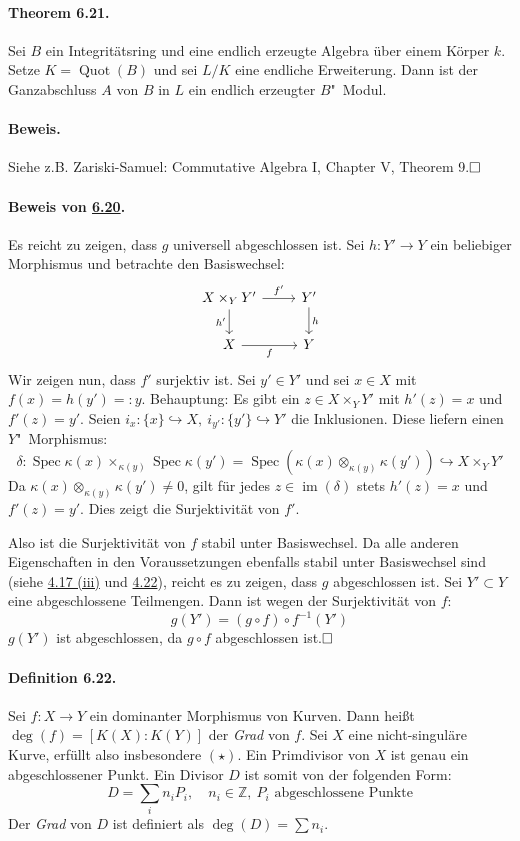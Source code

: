 \documentclass[11pt,b5paper,openany]{memoir}
\def \qed {$\hfill\square$}
\begin{document}
\paragraph{Theorem 6.21.}\label{6.21} Sei $B$ ein Integritätsring und eine endlich erzeugte Algebra über einem Körper $k$. Setze $K=\operatorname{Quot}(B)$ und sei $L/K$ eine endliche Erweiterung. Dann ist der Ganzabschluss $A$ von $B$ in $L$ ein endlich erzeugter $B$"~Modul.

\paragraph{Beweis.} Siehe z.B. Zariski-Samuel: Commutative Algebra I, Chapter V, Theorem 9.\qed

\paragraph{Beweis von \hyperref[6.20]{6.20}.} Es reicht zu zeigen, dass $g$ universell abgeschlossen ist. Sei $h:Y'\to Y$ ein beliebiger Morphismus und betrachte den Basiswechsel:
\[\begin{tikzcd}
X\times_Y Y' \ar[r, "f'"]\ar[d, "h'"'] & Y' \ar[d, "h"]\\
X\ar[r, "f"'] & Y
\end{tikzcd} \]
Wir zeigen nun, dass $f'$ surjektiv ist. Sei $y'\in Y'$ und sei $x\in X$ mit $f(x)=h(y')=:y$. Behauptung: Es gibt ein $z\in X\times_YY'$ mit $h'(z)=x$ und $f'(z)=y'$. Seien $i_x:\{x\}\hookrightarrow X,\ i_{y'}:\{y'\}\hookrightarrow Y'$ die Inklusionen. Diese liefern einen $Y$"~Morphismus:
\[\delta : \operatorname{Spec}\kappa(x)\times_{\kappa(y)}\operatorname{Spec}\kappa(y') = \operatorname{Spec}(\kappa(x)\otimes_{\kappa(y)}\kappa(y'))\hookrightarrow X\times_YY' \]
Da $\kappa(x)\otimes_{\kappa(y)}\kappa(y')\neq 0$, gilt für jedes $z\in\operatorname{im}(\delta)$ stets $h'(z)=x$ und $f'(z)=y'$. Dies zeigt die Surjektivität von $f'$.

Also ist die Surjektivität von $f$ stabil unter Basiswechsel. Da alle anderen Eigenschaften in den Voraussetzungen ebenfalls stabil unter Basiswechsel sind (siehe \hyperref[4.17]{4.17 (iii)} und \hyperref[4.22]{4.22}), reicht es zu zeigen, dass $g$ abgeschlossen ist. Sei $Y'\subset Y$ eine abgeschlossene Teilmengen. Dann ist wegen der Surjektivität von $f$:
\[g(Y')=(g\circ f)\circ f^{-1}(Y') \]
$g(Y')$ ist abgeschlossen, da $g\circ f$ abgeschlossen ist.\qed

\paragraph{Definition 6.22.}\label{6.22} Sei $f:X\to Y$ ein dominanter Morphismus von Kurven. Dann heißt $\deg(f)=[K(X):K(Y)]$ der \textit{Grad} von $f$. Sei $X$ eine nicht-singuläre Kurve, erfüllt also insbesondere $(\star)$. Ein Primdivisor von $X$ ist genau ein abgeschlossener Punkt. Ein Divisor $D$ ist somit von der folgenden Form:
\[D=\sum_i n_iP_i,\quad n_i\in\mathbb{Z},\ P_i\text{ abgeschlossene Punkte} \]
Der \textit{Grad} von $D$ ist definiert als $\deg(D)=\sum n_i$.
\end{document}
